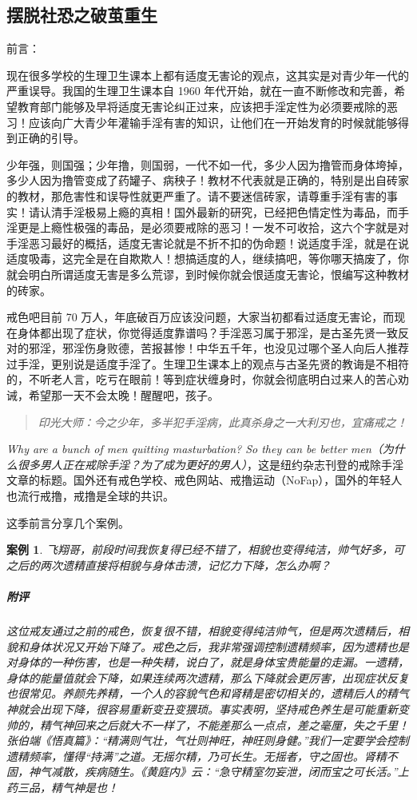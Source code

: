 \documentclass{ctexart}
\newtheorem{case}{案例}
\begin{document}
\subsection{摆脱社恐之破茧重生}

前言：

现在很多学校的生理卫生课本上都有适度无害论的观点，这其实是对青少年一代的严重误导。我国的生理卫生课本自 1960 年代开始，就在一直不断修改和完善，希望教育部门能够及早将适度无害论纠正过来，应该把手淫定性为必须要戒除的恶习！应该向广大青少年灌输手淫有害的知识，让他们在一开始发育的时候就能够得到正确的引导。

少年强，则国强；少年撸，则国弱，一代不如一代，多少人因为撸管而身体垮掉，多少人因为撸管变成了药罐子、病秧子！教材不代表就是正确的，特别是出自砖家的教材，那危害性和误导性就更严重了。请不要迷信砖家，请尊重手淫有害的事实！请认清手淫极易上瘾的真相！国外最新的研究，已经把色情定性为毒品，而手淫更是上瘾性极强的毒品，是必须要戒除的恶习！一发不可收拾，这六个字就是对手淫恶习最好的概括，适度无害论就是不折不扣的伪命题！说适度手淫，就是在说适度吸毒，这完全是在自欺欺人！想搞适度的人，继续搞吧，等你哪天搞废了，你就会明白所谓适度无害是多么荒谬，到时候你就会恨适度无害论，恨编写这种教材的砖家。

戒色吧目前 70 万人，年底破百万应该没问题，大家当初都看过适度无害论，而现在身体都出现了症状，你觉得适度靠谱吗？手淫恶习属于邪淫，是古圣先贤一致反对的邪淫，邪淫伤身败德，苦报甚惨！中华五千年，也没见过哪个圣人向后人推荐过手淫，更别说是适度手淫了。生理卫生课本上的观点与古圣先贤的教诲是不相符的，不听老人言，吃亏在眼前！等到症状缠身时，你就会彻底明白过来人的苦心劝诫，希望那一天不会太晚！醒醒吧，孩子。

\begin{quote}\it
    印光大师：今之少年，多半犯手淫病，此真杀身之一大利刃也，宜痛戒之！
\end{quote}

\textit{Why are a bunch of men quitting masturbation? So they can be better men（为什么很多男人正在戒除手淫？为了成为更好的男人）}，这是纽约杂志刊登的戒除手淫文章的标题。国外还有戒色学校、戒色网站、戒撸运动（NoFap），国外的年轻人也流行戒撸，戒撸是全球的共识。

这季前言分享几个案例。

\begin{case}
    飞翔哥，前段时间我恢复得已经不错了，相貌也变得纯洁，帅气好多，可之后的两次遗精直接将相貌与身体击溃，记忆力下降，怎么办啊？
    \subparagraph{附评} 这位戒友通过之前的戒色，恢复很不错，相貌变得纯洁帅气，但是两次遗精后，相貌和身体状况又开始下降了。戒色之后，我非常强调控制遗精频率，因为遗精也是对身体的一种伤害，也是一种失精，说白了，就是身体宝贵能量的走漏。一遗精，身体的能量值就会下降，如果连续两次遗精，那么下降就会更厉害，出现症状反复也很常见。养颜先养精，一个人的容貌气色和肾精是密切相关的，遗精后人的精气神就会出现下降，很容易重新变丑变猥琐。事实表明，坚持戒色养生是可能重新变帅的，精气神回来之后就大不一样了，不能差那么一点点，差之毫厘，失之千里！张伯端《悟真篇》：“精满则气壮，气壮则神旺，神旺则身健。”我们一定要学会控制遗精频率，懂得“持满”之道。无摇尔精，乃可长生。无摇者，守之固也。肾精不固，神气减散，疾病随生。《黄庭内》云：“急守精室勿妄泄，闭而宝之可长活。”上药三品，精气神是也！
\end{case}
\end{document}
